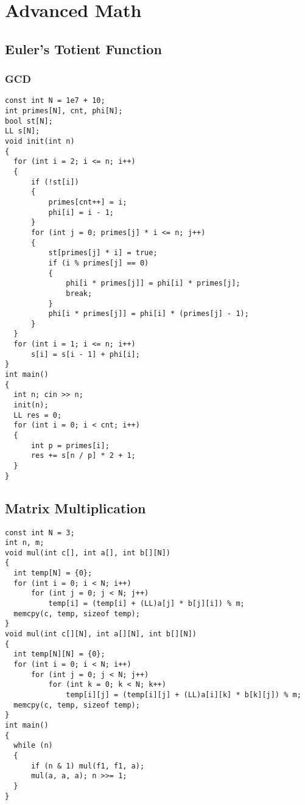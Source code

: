 \chapter{Advanced Math}\label{chap:AdvancedMath}
\section{Euler's Totient Function}
\subsection{GCD}
\begin{lstlisting}
const int N = 1e7 + 10;
int primes[N], cnt, phi[N];
bool st[N];
LL s[N];
void init(int n)
{
  for (int i = 2; i <= n; i++)
  {
      if (!st[i])
      {
          primes[cnt++] = i;
          phi[i] = i - 1;
      }
      for (int j = 0; primes[j] * i <= n; j++)
      {
          st[primes[j] * i] = true;
          if (i % primes[j] == 0)
          {
              phi[i * primes[j]] = phi[i] * primes[j];
              break;
          }
          phi[i * primes[j]] = phi[i] * (primes[j] - 1);
      }
  }
  for (int i = 1; i <= n; i++)
      s[i] = s[i - 1] + phi[i];
}
int main()
{
  int n; cin >> n;
  init(n);
  LL res = 0;
  for (int i = 0; i < cnt; i++)
  {
      int p = primes[i];
      res += s[n / p] * 2 + 1;
  }
}
\end{lstlisting}
\section{Matrix Multiplication}
\begin{lstlisting}
const int N = 3;
int n, m;
void mul(int c[], int a[], int b[][N])
{
  int temp[N] = {0};
  for (int i = 0; i < N; i++)
      for (int j = 0; j < N; j++)
          temp[i] = (temp[i] + (LL)a[j] * b[j][i]) % m;
  memcpy(c, temp, sizeof temp);
}
void mul(int c[][N], int a[][N], int b[][N])
{
  int temp[N][N] = {0};
  for (int i = 0; i < N; i++)
      for (int j = 0; j < N; j++)
          for (int k = 0; k < N; k++)
              temp[i][j] = (temp[i][j] + (LL)a[i][k] * b[k][j]) % m;
  memcpy(c, temp, sizeof temp);
}
int main()
{
  while (n)
  {
      if (n & 1) mul(f1, f1, a);
      mul(a, a, a); n >>= 1;
  }
}
\end{lstlisting}
